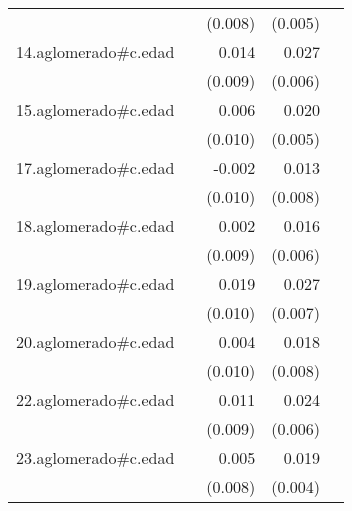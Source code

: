 {\begin{longtable}{l*{4}{D{.}{.}{-1}}}
            &                     &     (0.008)         &     (0.005)         &                     \\
\addlinespace
14.aglomerado#c.edad&                     &       0.014         &       0.027\sym{***}&                     \\
            &                     &     (0.009)         &     (0.006)         &                     \\
\addlinespace
15.aglomerado#c.edad&                     &       0.006         &       0.020\sym{***}&                     \\
            &                     &     (0.010)         &     (0.005)         &                     \\
\addlinespace
17.aglomerado#c.edad&                     &      -0.002         &       0.013         &                     \\
            &                     &     (0.010)         &     (0.008)         &                     \\
\addlinespace
18.aglomerado#c.edad&                     &       0.002         &       0.016\sym{*}  &                     \\
            &                     &     (0.009)         &     (0.006)         &                     \\
\addlinespace
19.aglomerado#c.edad&                     &       0.019         &       0.027\sym{***}&                     \\
            &                     &     (0.010)         &     (0.007)         &                     \\
\addlinespace
20.aglomerado#c.edad&                     &       0.004         &       0.018\sym{*}  &                     \\
            &                     &     (0.010)         &     (0.008)         &                     \\
\addlinespace
22.aglomerado#c.edad&                     &       0.011         &       0.024\sym{***}&                     \\
            &                     &     (0.009)         &     (0.006)         &                     \\
\addlinespace
23.aglomerado#c.edad&                     &       0.005         &       0.019\sym{***}&                     \\
            &                     &     (0.008)         &     (0.004)         &                     \\

\end{longtable}}
